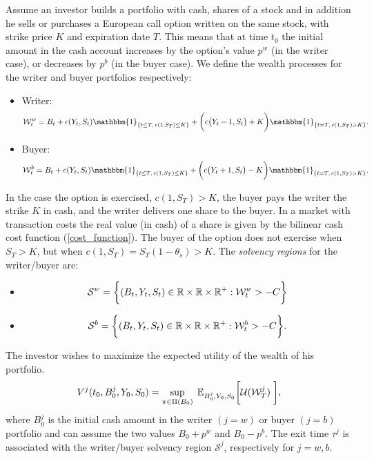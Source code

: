 Assume an investor builds a portfolio with cash, shares of a stock and in addition he sells or purchases a 
European call option written on the same stock, with strike price $K$ and expiration date $T$.
This means that at time $t_0$ the initial amount in the cash account increases by the option's value $p^w$ (in the writer case), 
or decreases by $p^b$ (in the buyer case). 
We define the wealth processes for the writer and buyer portfolios respectively:
\begin{itemize}
  \item Writer: 
  \begin{equation}\label{wealth_writer}
   \mathcal{W}^w_t =  B_t + c(Y_t,S_t) \mathbbm{1}_{\{t\leq T,\, c(1,S_T) \leq K\}} +
  \biggl( c\bigl( Y_t-1,S_t \bigr) + K \biggr) \mathbbm{1}_{\{t=T,\, c(1,S_T)>K\}}.
  \end{equation}
  \item Buyer: 
  \begin{equation}\label{wealth_buyer}
   \mathcal{W}^b_t = B_t + c(Y_t,S_t) \mathbbm{1}_{\{t\leq T,\, c(1,S_T) \leq K\}} +
  \biggl( c\bigl( Y_t+1,S_t \bigr) - K \biggr) \mathbbm{1}_{\{t=T,\, c(1,S_T)>K\}}.
  \end{equation}
\end{itemize}
In the case the option is exercised, $c(1,S_T) >K$, the buyer pays the writer the strike $K$ in cash, 
and the writer delivers one share to the buyer.
In a market with transaction costs 
the real value (in cash) of a share is given by the bilinear cash cost function (\ref{cost_function}). 
The buyer of the option does not exercise
when $S_T > K$, but when $c(1,S_T) = S_T (1-\theta_s) > K$.
The \emph{solvency regions} for the writer/buyer are:
\begin{itemize}
  \item  \begin{equation}\label{solvency_writer}
 \mathcal{S}^w = \biggl\{ (B_t,Y_t,S_t) \in \mathbb{R} \times \mathbb{R} \times \mathbb{R}^+ : \mathcal{W}^w_t  > -C  \biggr\}          
         \end{equation}
 
  \item \begin{equation}\label{solvency_buyer}
  \mathcal{S}^b = \biggl\{ (B_t,Y_t,S_t) \in \mathbb{R} \times \mathbb{R} \times \mathbb{R}^+ : \mathcal{W}^b_t  > -C  \biggr\}.        
        \end{equation}
\end{itemize}
The investor wishes to maximize the expected utility of the wealth of his portfolio. 
\begin{equation}\label{DPZ_max_probl1}
V^j(t_0,B_0^j,Y_0,S_0) = \sup_{\pi \in \Pi(B_0)} \; \mathbb{E}_{B_0^j,Y_0,S_0}\biggl[ 
            \mathcal{U}(\mathcal{W}^j_T) \; \biggr], 
\end{equation}
where $B_0^j$ is the initial cash amount in the writer $(j=w)$ or buyer $(j=b)$ portfolio and can assume the two values $B_0+p^w$ and $B_0-p^b$. 
The exit time $\tau^j$ is associated with the writer/buyer solvency region $ \mathcal{S}^j$, respectively for $j=w,b$.

